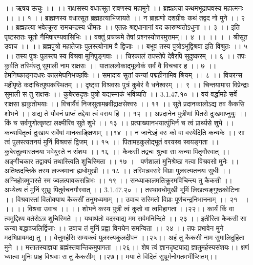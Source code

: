 ।। ऋषय ऊचुः ।। ।।
राक्षसस्य वधात्सूत रावणस्य महामुने ।।
ब्रह्महत्या कथमभूद्राघवस्य महात्मनः ।। ।। १ ।।
ब्राह्मणस्य वधात्सूत ब्रह्महत्याभिजायते ।।
न ब्राह्मणो दशग्रीवः कथं तद्वद नो मुने ।। २ ।।
ब्रह्महत्या भवेत्क्रूरा रामचन्द्रस्य धीमतः ।।
एतन्नः श्रद्दधानानां वद कारुण्यतोऽधुना ।। ३ ।।
इति पृष्टस्ततः सूतो नैमिषारण्यवासिभिः ।।
वक्तुं प्रचक्रमे तेषां प्रश्नस्योत्तरमुत्तमम्।। ४ ।। ।। ।
। श्रीसूत उवाच ।। ।।
ब्रह्मपुत्रो महातेजाः पुलस्त्योनाम वै द्विजाः ।।
बभूव तस्य पुत्रोऽभूद्विश्रवा इति विश्रुतः ।। ५ ।।
तस्य पुत्रः पुलस्त्य स्य विश्रवा मुनिपुङ्गवाः ।।
चिरकालं तपस्तेपे देवैरपि सुदुष्करम् ।। ६ ।।
तपः कुर्वति तस्मिंस्तु सुमाली नाम राक्षसः ।।
पाताललोकाद्भूलोकं सर्वं वै विचचार ह ।। ७ ।।
हेमनिष्काङ्गदधरः कालमेघनिभच्छविः ।।
समादाय सुतां कन्यां पद्महीनामिव श्रियम् ।। ८ ।।
विचरन्स महीपृष्ठे कदाचित्पुष्पकस्थितम् ।।
दृष्ट्वा विश्रवसः पुत्रं कुबेरं वै धनेश्वरम् ।। ९ ।।
चिन्तयामास विप्रेन्द्राः सुमाली स तु राक्षसः ।।
कुबेरसदृशः पुत्रो यद्यस्माकं भविष्यति ।। 3.1.47.१० ।।
वयं वर्द्धामहे सर्वे राक्षसा ह्यकुतोभयाः ।।
विचार्यैवं निजसुतामब्रवीद्राक्षसेश्वरः ।। ११ ।।
सुते प्रदानकालोऽद्य तव कैकसि शोभने ।।
अद्य ते यौवनं प्राप्तं तद्देया त्वं वराय हि ।। १२ ।।
अप्रदानेन पुत्रीणां पितरो दुःखमाप्नुयुः ।।
किं च सर्वगुणोत्कृष्टा लक्ष्मीरिव सुते शुभे ।। १३ ।।
प्रत्याख्यानभयात्पुंभिर्न च त्वं प्रार्थ्यसे शुभे ।।
कन्यापितृत्वं दुःखाय सर्वेषां मानकाङ्क्षिणाम् ।।१४ ।।
न जानेऽहं वरः को वा वरयेदिति कन्यके ।।
सा त्वं पुलस्त्यतनयं मुनिं विश्रवसं द्विजम् ।। १५ ।।
पितामहकुलोद्भूतं वरयस्व स्वयङ्गता ।।
कुबेरतुल्यास्तनया भवेयुस्ते न संशयः ।। १६ ।।
कैकसी तद्वचः श्रुत्वा सा कन्या पितृगौरवात् ।।
अङ्गीचकार तद्वाक्यं तथास्त्विति शुचिस्मिता ।। १७ ।।
पर्णशालां मुनिश्रेष्ठा गत्वा विश्रवसो मुनेः ।।
अतिष्ठदन्तिके तस्य लज्जमाना ह्यधोमुखी ।। १८ ।।
तस्मिन्नवसरे विप्राः पुलस्त्यतनयः सुधीः ।।
अग्निहोत्रमुपास्ते स्म ज्वलत्पावकसन्निभः ।। १९ ।।
सन्ध्याकालमतिक्रूरमविचिन्त्य तु कैकसी ।।
अभ्येत्य तं मुनिं सुभ्रूः पितुर्वचनगौरवात् ।। 3.1.47.२० ।।
तस्थावधोमुखी भूमिं लिखत्यङ्गुष्ठकोटिना ।।
विश्रवास्तां विलोक्याथ कैकसीं तनुमध्यमाम् ।।
उवाच सस्मितो विप्राः पूर्णचन्द्रनिभाननाम् ।। २१ ।। ।।
।। विश्रवा उवाच ।। ।।
शोभने कस्य पुत्री त्वं कुतो वा त्वमिहागता ।।२२।।
कार्यं किं वा त्वमुद्दिश्य वर्तसेऽत्र शुचिस्मिते ।।
यथार्थतो वदस्वाद्य मम सर्वमनिन्दिते ।। २३ ।।
इतीरिता कैकसी सा कन्या बद्धाञ्जलिर्द्विजाः ।।
उवाच तं मुनिं प्रह्वा विनयेन समन्विता ।। २४ ।।
तपः प्रभावेन मुने मदभिप्रायमद्य तु ।।
वेत्तुमर्हसि सम्यक्त्वं पुलस्त्यकुलदीपन ।।२५।।
अहं तु कैकसी नाम सुमालिदुहिता मुने ।।
मत्तातस्याज्ञया ब्रह्मंस्तवान्तिकमुपागता ।।२६।।
शेष त्वं ज्ञानदृष्ट्याद्य ज्ञातुमर्हस्यसंशयः।।
क्षणं ध्यात्वा मुनिः प्राह विश्रवाः स तु कैकसीम् ।।२७।।
मया ते विदितं सुभ्रूर्मनोगतमभीप्सितम्।।
